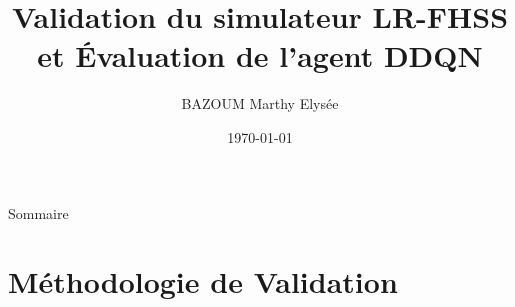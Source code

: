 \documentclass[aspectratio=169, 11pt]{beamer}
\title[Validation LR-FHSS et DDQN]{%
	Validation du simulateur LR-FHSS\\
	et Évaluation de  l'agent DDQN}
\author[]{BAZOUM Marthy Elysée}
\date{\today}
\begin{document}
	
	\begin{frame}
		\titlepage
	\end{frame}
	
	\begin{frame}{Sommaire}
		\tableofcontents[hideallsubsections]
	\end{frame}
	
	\section{Méthodologie de Validation}
	
\end{document}
